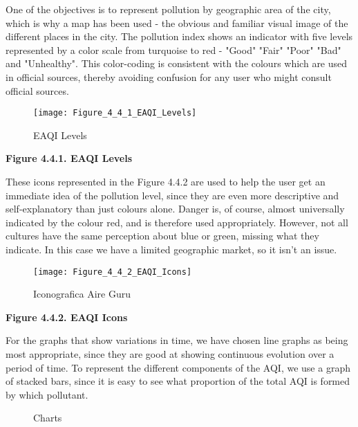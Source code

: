 One of the objectives is to represent pollution by geographic area of the city, which is why a map has been used - the 
obvious and familiar visual image of the different places in the city. The pollution index shows an indicator with 
five levels represented by a color scale from turquoise to red - "Good" "Fair" "Poor" "Bad" and "Unhealthy". 
This color-coding is consistent with the colours which are used in official sources, thereby avoiding confusion for any 
user who might consult official sources.

\begin{figure}[ht]
    \centering
    \texttt{[image: Figure\_4\_4\_1\_EAQI\_Levels]}
    \caption{EAQI Levels}
\end{figure}
\begin{center}
    \bf{        
    Figure 4.4.1. EAQI Levels}
\end{center}

These icons represented in the Figure 4.4.2 are used to help the user get an immediate idea of the pollution level, since they are even more
descriptive and self-explanatory than just colours alone. Danger is, of course, almost universally indicated by 
the colour red, and is therefore used appropriately. However, not all cultures have the same perception about
blue or green, missing what they indicate. In this case we have a limited geographic market, so it isn't an issue.\\

\begin{figure}[ht]
    \centering
    \texttt{[image: Figure\_4\_4\_2\_EAQI\_Icons]}
    \caption{Iconografica Aire Guru}
\end{figure}

\begin{center}
    \bf{        
    Figure 4.4.2. EAQI Icons}
\end{center}
For the graphs that show variations in time, we have chosen line graphs as being most appropriate,
since they are good at showing continuous evolution over a period of time. To represent the different components of the AQI, we use a
graph of stacked bars, since it is easy to see what proportion of the total AQI is formed by which pollutant. \\

\begin{figure}[ht]
    \centering
        \hfill
    \caption{Charts}
\end{figure}

